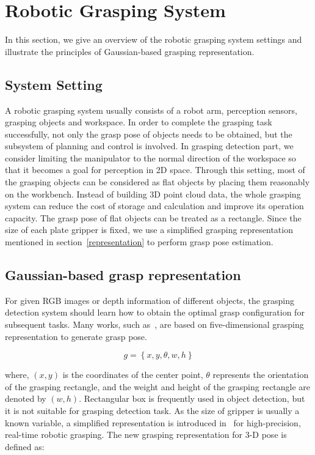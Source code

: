 \documentclass[journal]{IEEEtran}
\begin{document}
\section{Robotic Grasping System}
\label{sec-system}
In this section, we give an overview of the robotic grasping system settings and illustrate the principles of Gaussian-based grasping representation.

\subsection{System Setting}
\label{section_2.4}
A robotic grasping system usually consists of a robot arm, perception sensors, grasping objects and workspace. In order to complete the grasping task successfully, not only the grasp pose of objects needs to be obtained, but the subsystem of planning and control is involved. In grasping detection part, we consider limiting the manipulator to the normal direction of the workspace so that it becomes a goal for perception in 2D space. Through this setting, most of the grasping objects can be considered as flat objects by placing them reasonably on the workbench. Instead of building 3D point cloud data, the whole grasping system can reduce the cost of storage and calculation and improve its operation capacity. The grasp pose of flat objects can be treated as a rectangle. Since the size of each plate gripper is fixed, we use a simplified grasping representation mentioned in section~\ref{representation} to perform grasp pose estimation. 



\subsection{Gaussian-based grasp representation}
\label{representation_gaussian}
For given RGB images or depth information of different objects, the grasping detection system should learn how to obtain the optimal grasp configuration for subsequent tasks. Many works, such as~\cite{guo,chu,zhou}, are based on five-dimensional grasping representation to generate grasp pose.

\begin{equation}
g = \left\{x,y,\theta,w,h\right\}
\label{eq:5drepresentation}
\end{equation}

where, $(x,y)$ is the coordinates of the center point, $\theta$ represents the orientation of the grasping rectangle, and the weight and height of the grasping rectangle are denoted by $(w,h)$. Rectangular box is frequently used in object detection, but it is not suitable for grasping detection task. As the size of gripper is usually a known variable, a simplified representation is introduced in~\cite{ggcnn} for high-precision, real-time robotic grasping. The new grasping representation for 3-D pose is defined as:
\end{document}
